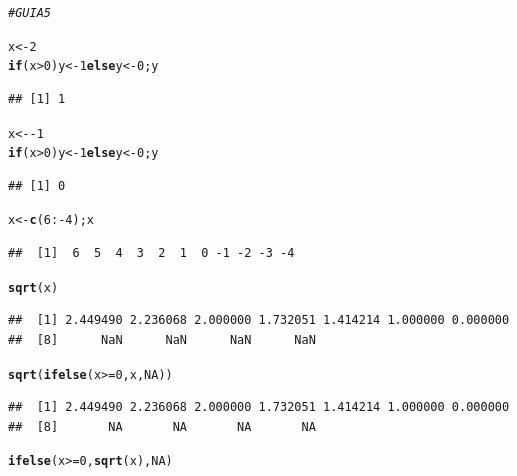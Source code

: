 \documentclass{article}\usepackage[]{graphicx}\usepackage[]{color}
\makeatletter
\newcommand{\hlnum}[1]{\textcolor[rgb]{0.686,0.059,0.569}{#1}}%
\newcommand{\hlcom}[1]{\textcolor[rgb]{0.678,0.584,0.686}{\textit{#1}}}%
\newcommand{\hlopt}[1]{\textcolor[rgb]{0,0,0}{#1}}%
\newcommand{\hlstd}[1]{\textcolor[rgb]{0.345,0.345,0.345}{#1}}%
\newcommand{\hlkwa}[1]{\textcolor[rgb]{0.161,0.373,0.58}{\textbf{#1}}}%
\newcommand{\hlkwb}[1]{\textcolor[rgb]{0.69,0.353,0.396}{#1}}%
\newcommand{\hlkwd}[1]{\textcolor[rgb]{0.737,0.353,0.396}{\textbf{#1}}}%
\newenvironment{kframe}{%
 \def\at@end@of@kframe{}%
 \ifinner\ifhmode%
  \def\at@end@of@kframe{\end{minipage}}%
  \begin{minipage}{\columnwidth}%
 \fi\fi%
 \def\FrameCommand##1{\hskip\@totalleftmargin \hskip-\fboxsep
 \colorbox{shadecolor}{##1}\hskip-\fboxsep
     \hskip-\linewidth \hskip-\@totalleftmargin \hskip\columnwidth}%
 \MakeFramed {\advance\hsize-\width
   \@totalleftmargin\z@ \linewidth\hsize
   \@setminipage}}%
 {\par\unskip\endMakeFramed%
 \at@end@of@kframe}
\newenvironment{knitrout}{}{} %
\makeatother
\begin{document}
\begin{knitrout}
\color{fgcolor}\begin{kframe}
\begin{alltt}
\hlcom{#GUIA 5}

\hlstd{x} \hlkwb{<-} \hlnum{2}
\hlkwa{if}\hlstd{(x}\hlopt{>}\hlnum{0}\hlstd{) y}\hlkwb{<-}\hlnum{1} \hlkwa{else} \hlstd{y}\hlkwb{<-}\hlnum{0}\hlstd{; y}
\end{alltt}
\begin{verbatim}
## [1] 1
\end{verbatim}
\begin{alltt}
\hlstd{x} \hlkwb{<-} \hlopt{-}\hlnum{1}
\hlkwa{if}\hlstd{(x}\hlopt{>}\hlnum{0}\hlstd{) y}\hlkwb{<-}\hlnum{1} \hlkwa{else} \hlstd{y}\hlkwb{<-}\hlnum{0}\hlstd{; y}
\end{alltt}
\begin{verbatim}
## [1] 0
\end{verbatim}
\begin{alltt}
\hlstd{x} \hlkwb{<-} \hlkwd{c}\hlstd{(}\hlnum{6}\hlopt{:-}\hlnum{4}\hlstd{); x}
\end{alltt}
\begin{verbatim}
##  [1]  6  5  4  3  2  1  0 -1 -2 -3 -4
\end{verbatim}
\begin{alltt}
\hlkwd{sqrt}\hlstd{(x)}
\end{alltt}


{\ttfamily\noindent\color{warningcolor}{\#\# Warning in sqrt(x): Se han producido NaNs}}\begin{verbatim}
##  [1] 2.449490 2.236068 2.000000 1.732051 1.414214 1.000000 0.000000
##  [8]      NaN      NaN      NaN      NaN
\end{verbatim}
\begin{alltt}
\hlkwd{sqrt}\hlstd{(}\hlkwd{ifelse}\hlstd{(x} \hlopt{>=} \hlnum{0}\hlstd{, x,} \hlnum{NA}\hlstd{))}
\end{alltt}
\begin{verbatim}
##  [1] 2.449490 2.236068 2.000000 1.732051 1.414214 1.000000 0.000000
##  [8]       NA       NA       NA       NA
\end{verbatim}
\begin{alltt}
\hlkwd{ifelse}\hlstd{(x} \hlopt{>=} \hlnum{0}\hlstd{,} \hlkwd{sqrt}\hlstd{(x),} \hlnum{NA}\hlstd{)}
\end{alltt}



\end{kframe}
\end{knitrout}
\end{document}
